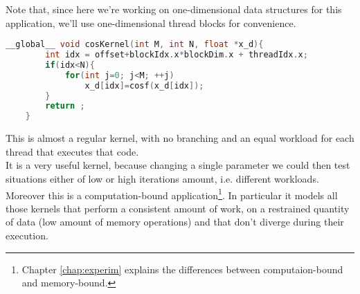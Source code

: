 	Note that, since here we're working on one-dimensional data structures for this application, we'll use one-dimensional thread blocks for convenience.
	\begin{lstlisting}[language=C++, caption={Implementation for Simple-Computation Kernel}]
	__global__ void cosKernel(int M, int N, float *x_d){  		  
		int idx = offset+blockIdx.x*blockDim.x + threadIdx.x; 		
		if(idx<N){		
			for(int j=0; j<M; ++j)
				x_d[idx]=cosf(x_d[idx]);  		
		}
		return ;
	}
	\end{lstlisting}
	This is almost a regular kernel, with no branching and an equal workload for each thread that executes that code.\\
	It is a very useful kernel, because changing a single parameter we could then test situations either of low or high iterations amount, i.e. different workloads.\\
	Moreover this is a computation-bound application\footnote{Chapter \ref{chap:experim} explains the differences between computaion-bound and memory-bound.}. In particular it models all those kernels that perform a consistent amount of work, on a restrained quantity of data (low amount of memory operations) and that don't diverge during their execution.

	
